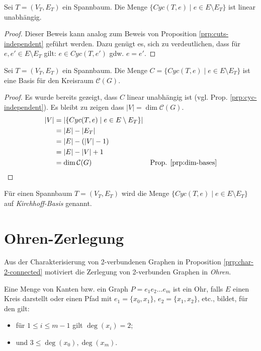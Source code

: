 \begin{proposition}
    \label{prp:cyc-independent}
    Sei $ T = (V_T, E_T) $ ein Spannbaum.
    Die Menge $ \{ Cyc(T, e) \mid e \in E \setminus E_T \} $ ist linear unabhängig.
\end{proposition}

\begin{proof}
    Dieser Beweis kann analog zum Beweis von Proposition \ref{prp:cuts-independent} geführt werden.
    Dazu genügt es, sich zu verdeutlichen, dass für $ e, e' \in E \setminus E_T $ gilt: $ e \in Cyc(T, e') $ gdw. $ e = e' $.
\end{proof}

\begin{proposition}
    Sei $ T = (V_T, E_T) $ ein Spannbaum.
    Die Menge $ C = \{ Cyc(T, e) \mid e \in E \setminus E_T \} $ ist eine Basis für den Kreisraum $ \mathcal{C}(G) $.
\end{proposition}

\begin{proof}
    Es wurde bereits gezeigt, dass $ C $ linear unabhängig ist (vgl. Prop. \ref{prp:cyc-independent}).
    Es bleibt zu zeigen dass $ |V| = \dim \mathcal{C}(G) $.
    \begin{align*}
        |V| &= |\{ Cyc(T, e) \mid e \in E \setminus E_T \}| \\
            &= |E| - |E_T| \\
            &= |E| - (|V| - 1) \\
            &= |E| - |V| + 1 \\
            &= \dim \mathcal{C}(G) & \text{Prop. \ref{prp:dim-bases}}
    \end{align*}
\end{proof}

\begin{remark}
    Für einen Spannbaum $ T = (V_T, E_T) $ wird die Menge $ \{ Cyc(T, e) \mid e \in E \setminus E_T \} $ auf \textit{Kirchhoff-Basis} genannt.
\end{remark}

\section{Ohren-Zerlegung}

Aus der Charakterisierung von 2-verbundenen Graphen in Proposition \ref{prp:char-2-connected} motiviert die Zerlegung von 2-verbunden Graphen in \textit{Ohren}.

\begin{definition}[Ohr]
    Eine Menge von Kanten bzw. ein Graph $ P = e_1e_2\dots e_m $ ist ein Ohr, falls $ E $ einen Kreis darstellt oder einen Pfad mit $ e_1 = \{ x_0, x_1 \} $, $ e_2 = \{ x_1, x_2 \} $, etc., bildet, für den gilt:
    \begin{itemize}
        \item für $ 1 \leq i \leq m - 1 $ gilt $ \deg(x_i) = 2 $;
        \item und $ 3 \leq \deg(x_0), \deg(x_m) $.
    \end{itemize}
\end{definition}

